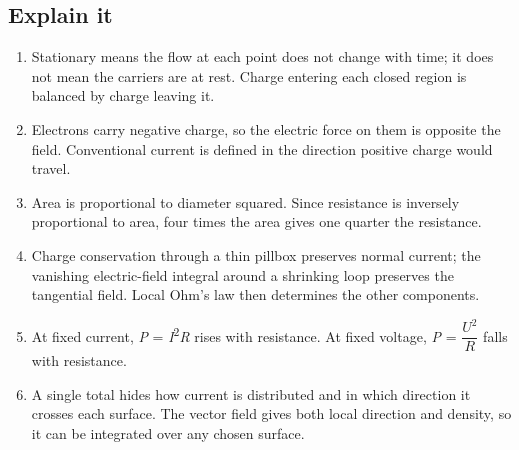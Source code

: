 \documentclass[11pt]{article}
\begin{document}
\begin{keepsection}\subsection{Explain it}

\begin{enumerate}
\item Stationary means the flow at each point does not change with time; it does not mean the carriers are at rest. Charge entering each closed region is balanced by charge leaving it.
\item Electrons carry negative charge, so the electric force on them is opposite the field. Conventional current is defined in the direction positive charge would travel.
\item Area is proportional to diameter squared. Since resistance is inversely proportional to area, four times the area gives one quarter the resistance.
\item Charge conservation through a thin pillbox preserves normal current; the vanishing electric-field integral around a shrinking loop preserves the tangential field. Local Ohm’s law then determines the other components.
\item At fixed current, \textit{P} = \textit{I}\textsuperscript{2}\textit{R} rises with resistance. At fixed voltage, \textit{P} = {\small\ensuremath{\dfrac{{U}^{2}}{{R}}}} falls with resistance.
\item A single total hides how current is distributed and in which direction it crosses each surface. The vector field gives both local direction and density, so it can be integrated over any chosen surface.
\end{enumerate}

\end{keepsection}
\end{document}

